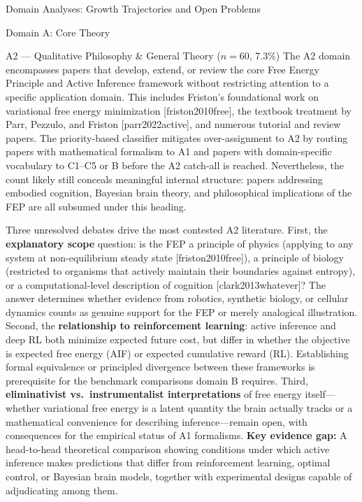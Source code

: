 \documentclass[
  ignorenonframetext,
]{beamer}
\providecommand{\citep}[1]{[#1]}
\begin{document}
\begin{frame}[allowframebreaks]{Domain Analyses: Growth Trajectories and
Open Problems \label{sec:subfield_analyses}}
\begin{block}{Domain A: Core Theory}
\begin{block}{A2 --- Qualitative Philosophy \& General Theory
(\(n = 60\), 7.3\%)}
\protect{}\label{a2-qualitative-philosophy-general-theory-n-60-7.3}
The A2 domain encompasses papers that develop, extend, or review the
core Free Energy Principle and Active Inference framework without
restricting attention to a specific application domain. This includes
Friston's foundational work on variational free energy minimization
\citep{friston2010free}, the textbook treatment by Parr, Pezzulo, and
Friston \citep{parr2022active}, and numerous tutorial and review papers.
The priority-based classifier mitigates over-assignment to A2 by routing
papers with mathematical formalism to A1 and papers with domain-specific
vocabulary to C1--C5 or B before the A2 catch-all is reached.
Nevertheless, the count likely still conceals meaningful internal
structure: papers addressing embodied cognition, Bayesian brain theory,
and philosophical implications of the FEP are all subsumed under this
heading.

Three unresolved debates drive the most contested A2 literature. First,
the \textbf{explanatory scope} question: is the FEP a principle of
physics (applying to any system at non-equilibrium steady state
\citep{friston2010free}), a principle of biology (restricted to
organisms that actively maintain their boundaries against entropy), or a
computational-level description of cognition \citep{clark2013whatever}?
The answer determines whether evidence from robotics, synthetic biology,
or cellular dynamics counts as genuine support for the FEP or merely
analogical illustration. Second, the \textbf{relationship to
reinforcement learning}: active inference and deep RL both minimize
expected future cost, but differ in whether the objective is expected
free energy (AIF) or expected cumulative reward (RL). Establishing
formal equivalence or principled divergence between these frameworks is
prerequisite for the benchmark comparisons domain B requires. Third,
\textbf{eliminativist vs.~instrumentalist interpretations} of free
energy itself---whether variational free energy is a latent quantity the
brain actually tracks or a mathematical convenience for describing
inference---remain open, with consequences for the empirical status of
A1 formalisms. \textbf{Key evidence gap:} A head-to-head theoretical
comparison showing conditions under which active inference makes
predictions that differ from reinforcement learning, optimal control, or
Bayesian brain models, together with experimental designs capable of
adjudicating among them.
\end{block}
\end{block}


\end{frame}
\end{document}
